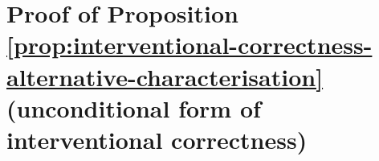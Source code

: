 

\section{Proof of Proposition \ref{prop:interventional-correctness-alternative-characterisation} (unconditional form of interventional correctness)} \label{sec:unconditional-interventional-correctness-proof}

